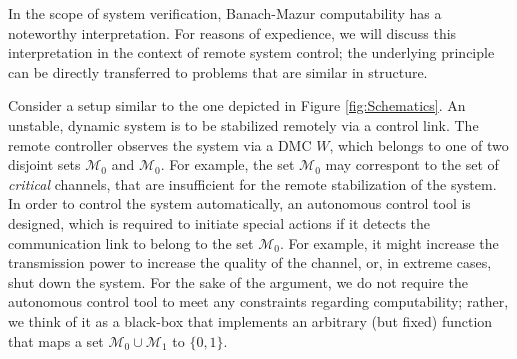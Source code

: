 \documentclass[conference]{IEEEtran}
\def\M{{\mathcal M}}
\begin{document}
	In the scope of system verification, Banach-Mazur computability has a noteworthy interpretation.
	For reasons of expedience, we will discuss this interpretation in the context of remote system control; the underlying principle can be 
	directly transferred to problems that are similar in structure.
	
	Consider a setup similar to the one depicted in Figure \ref{fig:Schematics}. An unstable, dynamic system is to be stabilized remotely via a control link.
	The remote controller observes the system via a DMC \(W\), which belongs to one of two disjoint sets \(\M_0\) and \(\M_0\). For example, the set \(\M_0\) may
	correspont to the set of \emph{critical} channels, that are insufficient for the remote stabilization of the system. In order to control the system automatically,
	an autonomous control tool is designed, which is required to initiate special actions if it detects the communication link to belong to the set \(\M_0\). For example,
	it might increase the transmission power to increase the quality of the channel, or, in extreme cases, shut down the system. For the sake of the argument, we
	do not require the autonomous control tool to meet any constraints regarding computability; rather, we think of it as a black-box that implements an arbitrary
	(but fixed) function that maps a set \(\M_0\cup \M_1\) to \(\{0,1\}\).
	
\end{document}

